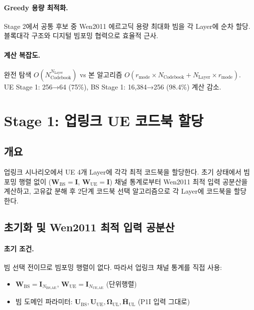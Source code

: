 \documentclass[10pt]{article}
\begin{document}
\paragraph{Greedy 용량 최적화.}
Stage 2에서 공통 후보 중 Wen2011 에르고딕 용량 최대화 빔을 각 Layer에 순차 할당. 블록대각 구조와 디지털 빔포밍 협력으로 효율적 근사.

\paragraph{계산 복잡도.}
완전 탐색 $O(N_{\text{Codebook}}^{N_{\text{Layer}}})$ vs 본 알고리즘 $O(r_{\text{mode}} \times N_{\text{Codebook}} + N_{\text{Layer}} \times r_{\text{mode}})$. UE Stage 1: 256→64 (75\%), BS Stage 1: 16,384→256 (98.4\%) 계산 감소.

\section{Stage 1: 업링크 UE 코드북 할당}

\subsection{개요}

업링크 시나리오에서 UE 4개 Layer에 각각 최적 코드북을 할당한다. 초기 상태에서 빔포밍 행렬 없이 ($\mathbf{W}_{\text{BS}} = \mathbf{I}$, $\mathbf{W}_{\text{UE}} = \mathbf{I}$) 채널 통계로부터 Wen2011 최적 입력 공분산을 계산하고, 고유값 분해 후 2단계 코드북 선택 알고리즘으로 각 Layer에 코드북을 할당한다.

\subsection{초기화 및 Wen2011 최적 입력 공분산}

\paragraph{초기 조건.}
빔 선택 전이므로 빔포밍 행렬이 없다. 따라서 업링크 채널 통계를 직접 사용:
\begin{itemize}
    \item $\mathbf{W}_{\text{BS}} = \mathbf{I}_{N_{\text{BS,AE}}}$, $\mathbf{W}_{\text{UE}} = \mathbf{I}_{N_{\text{UE,AE}}}$ (단위행렬)
    \item 빔 도메인 파라미터: $\mathbf{U}_{\text{BS}}, \mathbf{U}_{\text{UE}}, \boldsymbol{\Omega}_{\text{UL}}, \bar{\mathbf{H}}_{\text{UL}}$ (P1I 입력 그대로)
\end{itemize}
\end{document}
